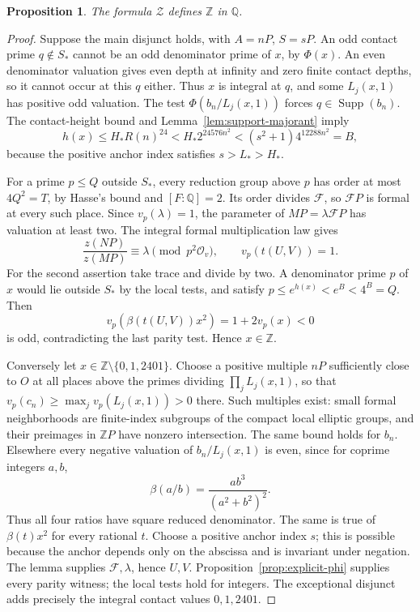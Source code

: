 \documentclass[11pt]{article}
\newtheorem{proposition}[theorem]{Proposition}
\theoremstyle{definition}
\newcommand{\Q}{\mathbb Q}\newcommand{\Z}{\mathbb Z}
\newcommand{\Supp}{\operatorname{Supp}}
\begin{document}
\begin{proposition}\label{prop:integers}
The formula \(\mathcal Z\) defines \(\Z\) in \(\Q\).
\end{proposition}
\begin{proof}
Suppose the main disjunct holds, with \(A=nP\), \(S=sP\).
An odd contact prime \(q\notin S_*\) cannot be an odd denominator
prime of \(x\), by \(\Phi(x)\). An even denominator valuation
gives even depth at infinity and zero finite contact depths, so it
cannot occur at this \(q\) either. Thus \(x\) is integral at
\(q\), and some \(L_j(x,1)\) has positive odd valuation.
The test \(\Phi(b_n/L_j(x,1))\) forces \(q\in\Supp(b_n)\).
The contact-height bound and Lemma~\ref{lem:support-majorant} imply
\[
 h(x)\le H_*R(n)^{24}
       <H_*2^{24576n^2}
       <(s^2+1)4^{12288n^2}=B,
\]
because the positive anchor index satisfies \(s>L_*>H_*\).

For a prime \(p\le Q\) outside \(S_*\), every reduction group
above \(p\) has order at most \(4Q^2=T\), by Hasse's bound and
\([F:\Q]=2\). Its order divides \(\mathcal F\), so \(\mathcal F P\) is formal
at every such place. Since \(v_p(\lambda)=1\), the parameter of
\(MP=\lambda\mathcal F P\) has valuation at least two. The integral formal
multiplication law gives
\[
 \frac{z(NP)}{z(MP)}\equiv\lambda\pmod{p^2\mathcal O_v},
 \qquad v_p(t(U,V))=1.
\]
For the second assertion take trace and divide by two. A denominator
prime \(p\) of \(x\) would lie outside \(S_*\) by the local
tests, and satisfy \(p\le e^{h(x)}<e^B<4^B=Q\). Then
\[
 v_p(\beta(t(U,V))x^2)=1+2v_p(x)<0
\]
is odd, contradicting the last parity test. Hence \(x\in\Z\).

Conversely let \(x\in\Z\setminus\{0,1,2401\}\). Choose a
positive multiple \(nP\) sufficiently close to \(O\) at all
places above the primes dividing \(\prod_jL_j(x,1)\), so that
\(v_p(c_n)\ge\max_jv_p(L_j(x,1))>0\) there. Such multiples
exist: small formal neighborhoods are finite-index subgroups of the
compact local elliptic groups, and their preimages in \(\Z P\)
have nonzero intersection. The same bound holds for \(b_n\).
Elsewhere every negative valuation of \(b_n/L_j(x,1)\) is even,
since for coprime integers \(a,b\),
\[
                 \beta(a/b)=\frac{ab^3}{(a^2+b^2)^2}.
\]
Thus all four ratios have square reduced denominator. The same is
true of \(\beta(t)x^2\) for every rational \(t\).
Choose a positive anchor index \(s\); this is possible because the
anchor depends only on the abscissa and is invariant under negation.
The lemma supplies \(\mathcal F,\lambda\), hence \(U,V\).
Proposition~\ref{prop:explicit-phi} supplies every parity witness;
the local tests hold for integers. The exceptional disjunct adds
precisely the integral contact values \(0,1,2401\).
\end{proof}
\end{document}
